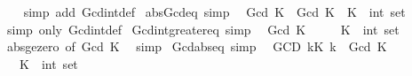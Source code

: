 \begin{isabellebody}
%
\isadelimproof
\ \ %
\endisadelimproof
%
\isatagproof
{}\isamarkupfalse%
\ {\isacharparenleft}{\kern0pt}simp\ add{\isacharcolon}{\kern0pt}\ Gcd{\isacharunderscore}{\kern0pt}int{\isacharunderscore}{\kern0pt}def{\isacharparenright}{\kern0pt}%
\endisatagproof
{\isafoldproof}%
%
\isadelimproof
\isanewline
%
\endisadelimproof
\isanewline
{}\isamarkupfalse%
\ abs{\isacharunderscore}{\kern0pt}Gcd{\isacharunderscore}{\kern0pt}eq\ {\isacharbrackleft}{\kern0pt}simp{\isacharbrackright}{\kern0pt}{\isacharcolon}{\kern0pt}\isanewline
\ \ {\isachardoublequoteopen}{\isasymbar}Gcd\ K{\isasymbar}\ {\isacharequal}{\kern0pt}\ Gcd\ K{\isachardoublequoteclose}\ \ K\ {\isacharcolon}{\kern0pt}{\isacharcolon}{\kern0pt}\ {\isachardoublequoteopen}int\ set{\isachardoublequoteclose}\isanewline
%
\isadelimproof
\ \ %
\endisadelimproof
%
\isatagproof
{}\isamarkupfalse%
\ {\isacharparenleft}{\kern0pt}simp\ only{\isacharcolon}{\kern0pt}\ Gcd{\isacharunderscore}{\kern0pt}int{\isacharunderscore}{\kern0pt}def{\isacharparenright}{\kern0pt}%
\endisatagproof
{\isafoldproof}%
%
\isadelimproof
\isanewline
%
\endisadelimproof
\isanewline
{}\isamarkupfalse%
\ Gcd{\isacharunderscore}{\kern0pt}int{\isacharunderscore}{\kern0pt}greater{\isacharunderscore}{\kern0pt}eq{\isacharunderscore}{\kern0pt}{}\ {\isacharbrackleft}{\kern0pt}simp{\isacharbrackright}{\kern0pt}{\isacharcolon}{\kern0pt}\isanewline
\ \ {\isachardoublequoteopen}Gcd\ K\ {\isasymge}\ {}{\isachardoublequoteclose}\isanewline
\ \ \ K\ {\isacharcolon}{\kern0pt}{\isacharcolon}{\kern0pt}\ {\isachardoublequoteopen}int\ set{\isachardoublequoteclose}\isanewline
%
\isadelimproof
\ \ %
\endisadelimproof
%
\isatagproof
{}\isamarkupfalse%
\ abs{\isacharunderscore}{\kern0pt}ge{\isacharunderscore}{\kern0pt}zero\ {\isacharbrackleft}{\kern0pt}of\ {\isachardoublequoteopen}Gcd\ K{\isachardoublequoteclose}{\isacharbrackright}{\kern0pt}\ \isamarkupfalse%
\ simp%
\endisatagproof
{\isafoldproof}%
%
\isadelimproof
\isanewline
%
\endisadelimproof
\isanewline
{}\isamarkupfalse%
\ Gcd{\isacharunderscore}{\kern0pt}abs{\isacharunderscore}{\kern0pt}eq\ {\isacharbrackleft}{\kern0pt}simp{\isacharbrackright}{\kern0pt}{\isacharcolon}{\kern0pt}\isanewline
\ \ {\isachardoublequoteopen}{\isacharparenleft}{\kern0pt}GCD\ k{\isasymin}K{\isachardot}{\kern0pt}\ {\isasymbar}k{\isasymbar}{\isacharparenright}{\kern0pt}\ {\isacharequal}{\kern0pt}\ Gcd\ K{\isachardoublequoteclose}\isanewline
\ \ \ K\ {\isacharcolon}{\kern0pt}{\isacharcolon}{\kern0pt}\ {\isachardoublequoteopen}int\ set{\isachardoublequoteclose}\isanewline

\end{isabellebody}
